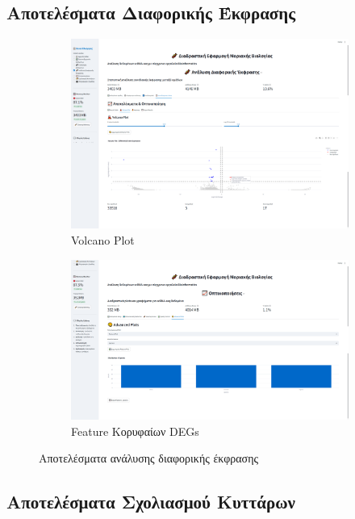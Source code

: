 \documentclass[11pt,a4paper]{article}
\begin{document}
\subsection{Αποτελέσματα Διαφορικής Έκφρασης}

\begin{figure}[H]
    \centering
    \begin{subfigure}{0.45\textwidth}
         \includegraphics[width=1.0\linewidth]{volcano_plot.png}
        \caption{Volcano Plot}
    \end{subfigure}
    \hfill
    \begin{subfigure}{0.45\textwidth}
       \includegraphics[width=1.0\linewidth]{extra_plots.png}
        \caption{Feature Κορυφαίων DEGs}
    \end{subfigure}
    \caption{Αποτελέσματα ανάλυσης διαφορικής έκφρασης}
    \label{fig:deg_results}
\end{figure}

\subsection{Αποτελέσματα Σχολιασμού Κυττάρων}
\end{document}
